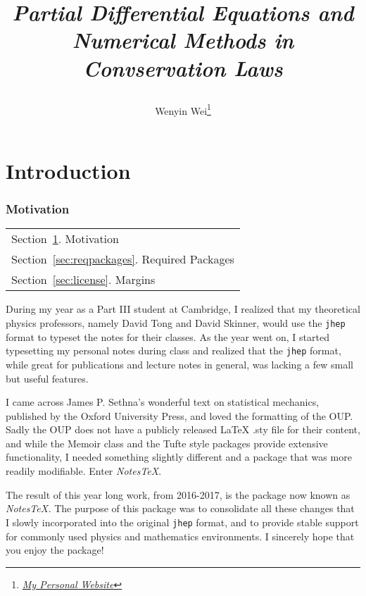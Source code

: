 \documentclass[10pt]{article}
\title{\begin{center}{\Huge \textit{Partial Differential Equations and\\ Numerical Methods in Convservation Laws}}\end{center}}
\author{Wenyin Wei\footnote{\href{https://wenyin.xyz/}{\textit{My Personal Website}}}}
\affiliation{
Tsinghua University\\
Department of Engineering Physics
}
\begin{document}
	\maketitle
	\flushbottom
	\newpage
	\pagestyle{fancynotes}


	
	\part{Introduction}
	\section{Motivation}\label{sec:motivation}
	\begin{margintable}\vspace{.8in}\footnotesize
		\begin{tabularx}{\marginparwidth}{|X}
		Section~\ref{sec:motivation}. Motivation\\
		Section~\ref{sec:reqpackages}. Required Packages\\
		Section~\ref{sec:license}. Margins\\
		\end{tabularx}
	\end{margintable}
	During my year as a Part III student at Cambridge, I realized that my theoretical physics professors, namely David Tong and David Skinner, would use the \texttt{jhep} format to typeset the notes for their classes. As the year went on, I started typesetting my personal notes during class and realized that the \texttt{jhep} format, while great for publications and lecture notes in general, was lacking a few small but useful features.

	I came across James P. Sethna's wonderful text on statistical mechanics, published by the Oxford University Press, and loved the formatting of the OUP. Sadly the OUP does not have a publicly released LaTeX .sty file for their content, and while the Memoir class and the Tufte style packages provide extensive functionality, I needed something slightly different and a package that was more readily modifiable. Enter \textit{NotesTeX}.

	The result of this year long work, from 2016-2017, is the package now known as \textit{NotesTeX.} The purpose of this package was to consolidate all these changes that I slowly incorporated into the original \texttt{jhep} format, and to provide stable support for commonly used physics and mathematics environments. I sincerely hope that you enjoy the package!
\end{document}
